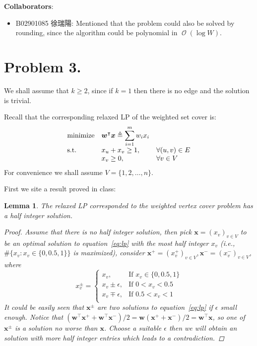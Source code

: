 \documentclass[12pt, a4paper]{article}
\newtheorem{lemma}{Lemma}
\newcommand{\defeq}{\triangleq}
\DeclareMathOperator*{\ord}{\mathcal{O}}
\begin{document}
{\bf Collaborators}:
\begin{itemize}[topsep=-5pt]
  \item B02901085 徐瑞陽: Mentioned that the problem could also be solved by rounding,
    since the algorithm could be polynomial in $\ord(\log W)$.
\end{itemize}

\section{Problem 3.}

We shall assume that $k \geq 2$, since if $k = 1$ then there is no edge and the solution is trivial.

Recall that the corresponding relaxed LP of the weighted set cover is:
\begin{equation} \label{eq:lp}
  \begin{array}{*3{>{\displaystyle}l}}
    \text{minimize} & \bm{w}^\intercal \bm{x} \defeq \sum_{i = 1}^m w_i x_i & \\
    \text{s.t.} & x_u + x_v \geq 1, &\forall (u, v) \in E \\
    & x_v \geq 0, &\forall v \in V
  \end{array}
\end{equation}
For convenience we shall assume $V = \{1, 2, \dots, n\}$.

First we site a result proved in class: \medskip

\begin{lemma}
  The relaxed LP corresponded to the weighted vertex cover problem has a half integer solution.
  \begin{proof}
    Assume that there is no half integer solution, then pick
    $\bm{x} = (x_v)_{v \in V}$ to be an optimal solution to equation~\ref{eq:lp} with the most half integer $x_v$
    (i.e., $\# \big\{x_v : x_v \in \{0, 0.5, 1\}\big\}$ is maximized),
    consider
    $\bm{x}^+ = (x_v^+)_{v \in V}, \bm{x}^- = (x_v^-)_{v \in V}$, where
    \begin{equation*}
      x_v^\pm = \begin{cases}
        x_v, & \text{If } x_v \in \{0, 0.5, 1\} \\
        x_v \pm \epsilon, & \text{If } 0 < x_v < 0.5 \\
        x_v \mp \epsilon, & \text{If } 0.5 < x_v < 1 \\
      \end{cases}
    \end{equation*}
    It could be easily seen that $\bm{x}^\pm$ are two solutions to equation~\ref{eq:lp}
    if $\epsilon$ small enough. Notice that $(\bm{w}^\intercal \bm{x}^+ + \bm{w}^\intercal \bm{x}^-)/2
    = \bm{w} (\bm{x}^+ + \bm{x}^-)/2 = \bm{w}^\intercal \bm{x}$, so one of $\bm{x}^\pm$ is a solution
    no worse than $\bm{x}$. Choose a suitable $\epsilon$ then we will obtain an solution with more
    half integer entries which leads to a contradiction.
  \end{proof}
\end{lemma}
\end{document}
